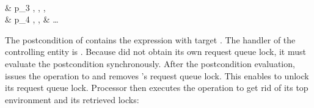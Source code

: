 \begin{fortechnicalreport}
\begin{example}
{{{					} \\
				& \simplifiedstateobjectsentry
					{p_{3}}
					{
						,
						,
						,
					} \\
				& \simplifiedstateobjectsentry
					{p_{4}}
					{
						,
						,
					}
			}
			{
				& \simplifiedstateoncestatusentry
					{\simplifiedstateallprocessorsindicator}
					{
					}
			}
			{\ldots}
	}

The postcondition of  contains the expression  with target . The handler of the controlling entity is . Because  did not obtain its own request queue lock, it must evaluate the postcondition synchronously. After the postcondition evaluation,  issues the  operation to  and removes 's request queue lock. This enables  to unlock its request queue lock. Processor  then executes the  operation to get rid of its top environment and its retrieved locks:


\end{example}
\end{fortechnicalreport}
